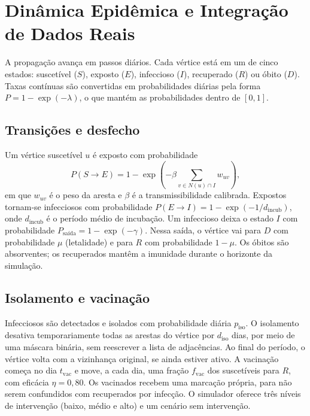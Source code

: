 \documentclass[11pt]{article}
\begin{document}
\section{Dinâmica Epidêmica e Integração de Dados Reais} \label{sec:dinamica}

A propagação avança em passos diários. Cada vértice está em um de cinco estados: suscetível ($S$), exposto ($E$), infeccioso ($I$), recuperado ($R$) ou óbito ($D$). Taxas contínuas são convertidas em probabilidades diárias pela forma $P = 1 - \exp(-\lambda)$, o que mantém as probabilidades dentro de $[0,1]$.

\subsection{Transições e desfecho}

Um vértice suscetível $u$ é exposto com probabilidade
\begin{equation}
P(S \to E) = 1 - \exp\left(-\beta \sum_{v \in N(u) \cap I} w_{uv}\right),
\end{equation}
em que $w_{uv}$ é o peso da aresta e $\beta$ é a transmissibilidade calibrada. Expostos tornam-se infecciosos com probabilidade $P(E \to I) = 1 - \exp(-1/d_{\text{incub}})$, onde $d_{\text{incub}}$ é o período médio de incubação. Um infeccioso deixa o estado $I$ com probabilidade $P_{\text{saída}} = 1 - \exp(-\gamma)$. Nessa saída, o vértice vai para $D$ com probabilidade $\mu$ (letalidade) e para $R$ com probabilidade $1 - \mu$. Os óbitos são absorventes; os recuperados mantêm a imunidade durante o horizonte da simulação.

\subsection{Isolamento e vacinação}

Infecciosos são detectados e isolados com probabilidade diária $p_{\text{iso}}$. O isolamento desativa temporariamente todas as arestas do vértice por $d_{\text{iso}}$ dias, por meio de uma máscara binária, sem reescrever a lista de adjacências. Ao final do período, o vértice volta com a vizinhança original, se ainda estiver ativo. A vacinação começa no dia $t_{\text{vac}}$ e move, a cada dia, uma fração $f_{\text{vac}}$ dos suscetíveis para $R$, com eficácia $\eta = 0{,}80$. Os vacinados recebem uma marcação própria, para não serem confundidos com recuperados por infecção. O simulador oferece três níveis de intervenção (baixo, médio e alto) e um cenário sem intervenção.
\end{document}
